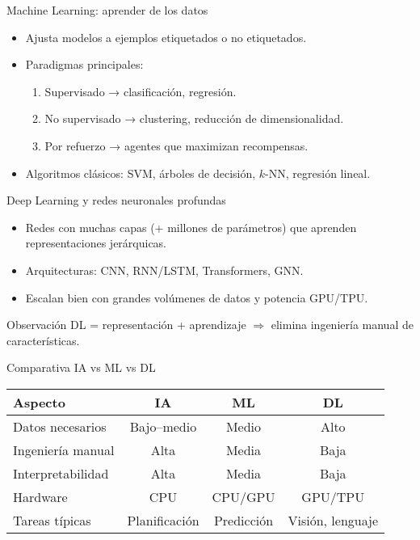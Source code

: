 \documentclass[12pt,spanish]{beamer}
\begin{document}
\begin{frame}{Machine Learning: aprender de los datos}
  \begin{itemize}
    \item Ajusta modelos a ejemplos etiquetados o no etiquetados.
    \item Paradigmas principales:
      \begin{enumerate}
        \item Supervisado → clasificación, regresión.
        \item No supervisado → clustering, reducción de dimensionalidad.
        \item Por refuerzo → agentes que maximizan recompensas.
      \end{enumerate}
    \item Algoritmos clásicos: SVM, árboles de decisión, \(k\)-NN, regresión lineal.
  \end{itemize}
\end{frame}

\begin{frame}{Deep Learning y redes neuronales profundas}
  \begin{itemize}
    \item Redes con muchas capas (+ millones de parámetros) que aprenden
          representaciones jerárquicas.
    \item Arquitecturas: CNN, RNN/LSTM, Transformers, GNN.
    \item Escalan bien con grandes volúmenes de datos y potencia GPU/TPU.
  \end{itemize}
  \begin{block}{Observación}
    DL = representación + aprendizaje \(\Rightarrow\) elimina ingeniería manual de características.
  \end{block}
\end{frame}

\begin{frame}{Comparativa IA vs ML vs DL}
  \begin{tabular}{lccc}
    \textbf{Aspecto} & \textbf{IA} & \textbf{ML} & \textbf{DL}\\\hline
    Datos necesarios & Bajo–medio & Medio & Alto\\
    Ingeniería manual & Alta & Media & Baja\\
    Interpretabilidad & Alta & Media & Baja\\
    Hardware & CPU & CPU/GPU & GPU/TPU\\
    Tareas típicas & Planificación & Predicción & Visión, lenguaje\\
  \end{tabular}
\end{frame}
\end{document}
